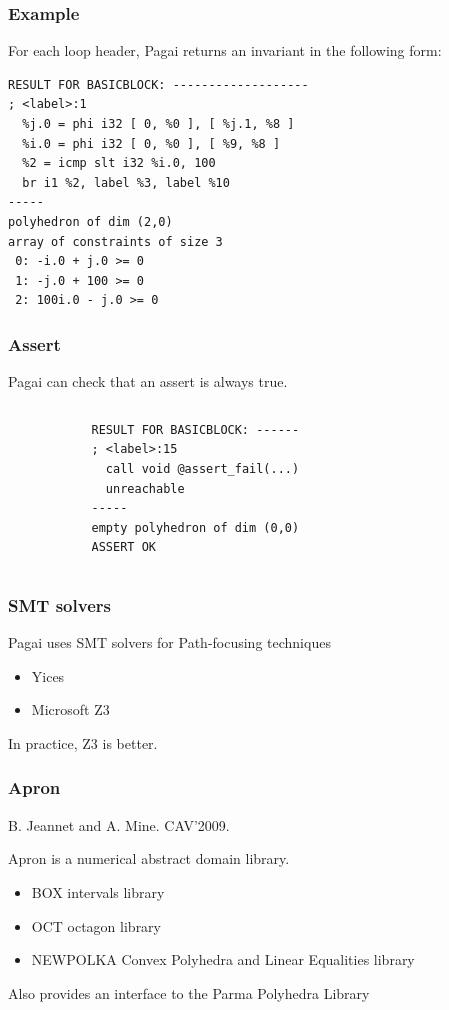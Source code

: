 \documentclass{beamer}
\begin{document}
\begin{frame}[containsverbatim]
	\frametitle{Example}
For each loop header, Pagai returns an invariant in the following form:
	\begin{verbatim}
RESULT FOR BASICBLOCK: -------------------
; <label>:1 
  %j.0 = phi i32 [ 0, %0 ], [ %j.1, %8 ]
  %i.0 = phi i32 [ 0, %0 ], [ %9, %8 ]
  %2 = icmp slt i32 %i.0, 100
  br i1 %2, label %3, label %10
-----
polyhedron of dim (2,0)
array of constraints of size 3
 0: -i.0 + j.0 >= 0
 1: -j.0 + 100 >= 0
 2: 100i.0 - j.0 >= 0
\end{verbatim}
\end{frame}

\begin{frame}[containsverbatim]
	\frametitle{Assert}
Pagai can check that an assert is always true.
\begin{columns}
	
\begin{column}{1cm}
\end{column}
\begin{column}{10cm}
\begin{verbatim}
RESULT FOR BASICBLOCK: ------
; <label>:15                                      
  call void @assert_fail(...) 
  unreachable
-----
empty polyhedron of dim (0,0)
ASSERT OK
\end{verbatim}
\end{column}
\end{columns}
\end{frame}

\begin{frame}
	\frametitle{SMT solvers}
	Pagai uses SMT solvers for Path-focusing techniques

	\begin{itemize}
		\item Yices
		\item Microsoft Z3
	\end{itemize}

	In practice, Z3 is better.
\end{frame}

\begin{frame}
	\frametitle{Apron}
B. Jeannet and A. Mine. CAV'2009. 

\vspace{1cm}

Apron is a numerical abstract domain library.

\begin{itemize}
	\item BOX intervals library
	\item OCT octagon library
	\item NEWPOLKA Convex Polyhedra and Linear Equalities library 
\end{itemize}
Also provides an interface to the Parma Polyhedra Library
\end{frame}
\end{document}
